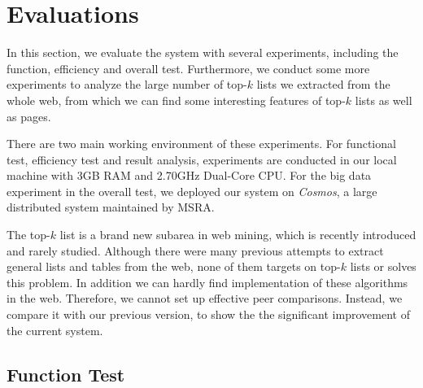 \section{Evaluations}
\label{sec:eval}
In this section, we evaluate the system with several experiments,
including the function, efficiency and overall test.
Furthermore, we conduct some more experiments to analyze the large number of
top-$k$ lists we extracted from the whole web,
from which we can find some interesting features of top-$k$ lists as well as pages.

There are two main working environment of these experiments.
For functional test, efficiency test and result analysis,
experiments are conducted in our local machine with 3GB RAM and 2.70GHz Dual-Core CPU.
For the big data experiment in the overall test, we deployed our system on \emph{Cosmos},
a large distributed system maintained by MSRA.

The top-$k$ list is a brand new subarea in web mining,
which is recently introduced\cite{ZZX2012KDD}
and rarely studied.
Although there were many previous attempts
\cite{googlesets,webtables08,LiuGZ03:MDR,MiaoTHSM09:TagPathClustering,GatterbauerBHKP2007:Towards,FumarolaWBMH11:List}
to extract general lists and tables from the web,
none of them targets on top-$k$ lists or solves this problem.
In addition we can hardly find implementation of these algorithms in the web.
Therefore, we cannot set up effective peer comparisons.
Instead, we compare it with our previous version\cite{ZZX2012KDD},
to show the the significant improvement of the current system.

%


\subsection{Function Test}
